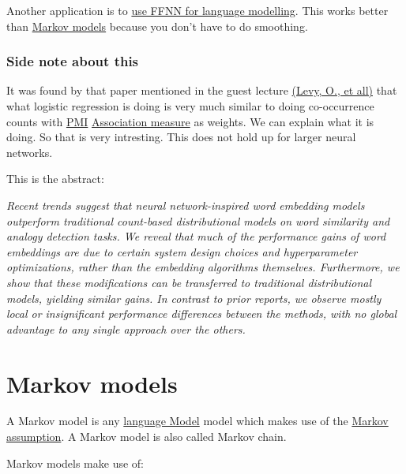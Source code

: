 \documentclass[
  11pt,
  british,
]{article}
\begin{document}
Another application is to
\href{../Prediction/Using\%20FFNN\%20for\%20language\%20modelling.md}{use
FFNN for language modelling}. This works better than
\href{../Prediction/Markov\%20models.md}{Markov models} because you
don't have to do smoothing.

\hypertarget{side-note-about-this}{%
\subsubsection{Side note about this}\label{side-note-about-this}}

It was found by that paper mentioned in the guest lecture
\href{https://scholar.google.nl/scholar?q=improving+distributional+similarity+with+lessons+learned+from+word+embeddings\&hl=en\&as_sdt=0\&as_vis=1\&oi=scholart}{(Levy,
O., et all)} that what logistic regression is doing is very much similar
to doing co-occurrence counts with
\href{../Semantic-Similarity/Point\%20wise\%20mutual\%20information\%20(PMI).md}{PMI}
\href{../Semantic-Similarity/Association\%20measure.md}{Association
measure} as weights. We can explain what it is doing. So that is very
intresting. This does not hold up for larger neural networks.

This is the abstract:

\emph{Recent trends suggest that neural network-inspired word embedding
models outperform traditional count-based distributional models on word
similarity and analogy detection tasks. We reveal that much of the
performance gains of word embeddings are due to certain system design
choices and hyperparameter optimizations, rather than the embedding
algorithms themselves. Furthermore, we show that these modifications can
be transferred to traditional distributional models, yielding similar
gains. In contrast to prior reports, we observe mostly local or
insignificant performance differences between the methods, with no
global advantage to any single approach over the others.}

\hypertarget{markov-models}{%
\section{Markov models}\label{markov-models}}

A Markov model is any \href{Language\%20Modeling.md}{language Model}
model which makes use of the \href{Markov\%20assumption.md}{Markov
assumption}. A Markov model is also called Markov chain.

Markov models make use of:
\end{document}
